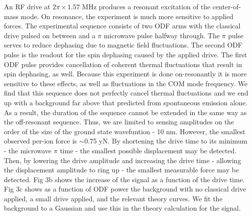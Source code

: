 \documentclass[aps,prl,twocolumn,groupedaddress]{revtex4-1}
\begin{document}
An RF drive at $2\pi \times 1.57$ MHz produces a resonant excitation of the center-of-mass mode. On resonance, the experiment is much more sensitive to applied forces. The experimental sequence consists of two ODF arms with the classical drive pulsed on between and a $\pi$ microwave pulse halfway through. The $\pi$ pulse serves to reduce dephasing due to magnetic field fluctuations. The second ODF pulse is the readout for the spin dephasing caused by the applied drive. The first ODF pulse provides cancellation of coherent thermal fluctuations that result in spin dephasing, as well. Because this experiment is done on-resonantly it is more sensitive to these effects, as well as fluctuations in the COM mode frequency. We find that this sequence does not perfectly cancel thermal fluctuations and we end up with a background far above that predicted from spontaneous emission alone. As a result, the duration of the sequence cannot be extended in the same way as the off-resonant sequence. Thus, we are limited to sensing amplitudes on the order of the size of the ground state wavefuntion - 10 nm. However, the smallest observed per-ion force is $\sim$0.75 yN. 
By shortening the drive time to its minimum - the microwave $\pi$ time - the smallest possible displacement may be detected. Then, by lowering the drive amplitude and increasing the drive time - allowing the displacement amplitude to ring up - the smallest measurable force may be detected. Fig 3b shows the increase of the signal as a function of the drive time. Fig 3c shows as a function of ODF power the background with no classical drive applied, a small drive applied, and the relevant theory curves. We fit the background to a Gaussian and use this in the theory calculation for the signal.
\end{document}
